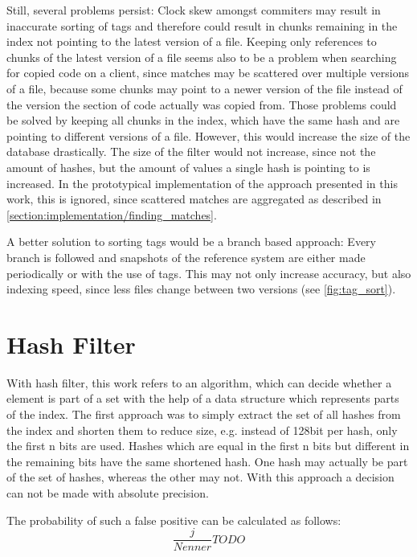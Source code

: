 Still, several problems persist: 
Clock skew amongst commiters may result in inaccurate sorting of tags and therefore could result in chunks remaining in the index not pointing to the latest version of a file.
Keeping only references to chunks of the latest version of a file seems also to be a problem when searching for copied code on a client, since matches may be scattered over multiple versions of a file, because some chunks may point to a newer version of the file instead of the version the section of code actually was copied from.
Those problems could be solved by keeping all chunks in the index, which have the same hash and are pointing to different versions of a file.
However, this would increase the size of the database drastically.
The size of the filter would not increase, since not the amount of hashes, but the amount of values a single hash is pointing to is increased.
In the prototypical implementation of the approach presented in this work, this is ignored, since scattered matches are aggregated as described in \ref{section:implementation/finding_matches}.

A better solution to sorting tags would be a branch based approach:
Every branch is followed and snapshots of the reference system are either made periodically or with the use of tags.
This may not only increase accuracy, but also indexing speed, since less files change between two versions (see \autoref{fig:tag_sort}).

\section{Hash Filter}\label{section:implementation/hash_filter}
With hash filter, this work refers to an algorithm, which can decide whether a element is part of a set with the help of a data structure which represents parts of the index.
The first approach was to simply extract the set of all hashes from the index and shorten them to reduce size, e.g. instead of 128bit per hash, only the first n bits are used.
Hashes which are equal in the first n bits but different in the remaining bits have the same shortened hash.
One hash may actually be part of the set of hashes, whereas the other may not.
With this approach a decision can not be made with absolute precision.

The probability of such a false positive can be calculated as follows:
\begin{equation}
	\frac{j}{Nenner} TODO
\end{equation}

